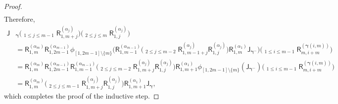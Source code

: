 \documentclass[12pt, reqno]{amsart}
\newcommand{\sfR}{\mathsf{R}}
\theoremstyle{definition}
\newcommand{\dscprod}{\mathop{\overleftarrow{\prod}}}
\numberwithin{equation}{section}
\begin{document}
\begin{proof}
\begin{align*}
\end{align*}
Therefore,
\begin{align*}
    \mathsf J&_{\boldsymbol\gamma}\Big(\dscprod_{1\le j\le m-1}
\sfR_{1,m+j}^{(\alpha_j)}\Big)\Big(\dscprod_{2\le j\le m}
\sfR_{1,j}^{(\alpha_j)}\Big)\\
&=\sfR_{1,m}^{(\alpha_m)}\sfR_{1,2m-1}^{(\alpha_{m-1})}\phi_{[1,2m-1]\setminus\{m\}}\Big(\sfR_{1,m-1}^{(\alpha_{m-1})}\Big(\dscprod_{2\le j\le m-2}\!\!
\sfR_{1,m-1+j}^{(\alpha_j)}\sfR_{1,j}^{(\alpha_j)}\Big)\sfR_{1,m}^{(\alpha_1)}
\mathsf J_{\boldsymbol\gamma^-}\Big)\Big(\dscprod_{1\le i\le m-1}\!\!
\sfR_{m,i+m}^{(\boldsymbol\gamma(i,m))}\Big)\\
&=\sfR_{1,m}^{(\alpha_m)}\sfR_{1,2m-1}^{(\alpha_{m-1})}\sfR_{1,m-1}^{(\alpha_{m-1})}\Big(\dscprod_{2\le j\le m-2}\!\!
\sfR_{1,m+j}^{(\alpha_j)}\sfR_{1,j}^{(\alpha_j)}\Big)\sfR_{1,m+1}^{(\alpha_1)}\phi_{[1,2m-1]\setminus\{m\}}(\mathsf J_{\boldsymbol\gamma^-})\Big(\dscprod_{1\le i\le m-1}
\sfR_{m,i+m}^{(\boldsymbol\gamma(i,m))}\Big)\\
&=\sfR_{1,m}^{(\alpha_m)}\Big(\dscprod_{2\le j\le m-1}
\sfR_{1,m+j}^{(\alpha_j)}\sfR_{1,j}^{(\alpha_j)}\Big)\sfR_{1,m+1}^{(\alpha_1)}
\mathsf J_{\boldsymbol\gamma},
\end{align*}
which completes the proof of the inductive step.
\end{proof}
\end{document}
